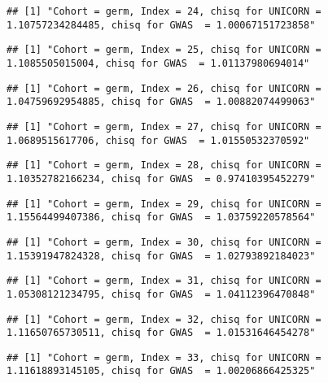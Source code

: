 \documentclass[]{article}
\begin{document}
\begin{verbatim}
## [1] "Cohort = germ, Index = 24, chisq for UNICORN = 1.10757234284485, chisq for GWAS  = 1.00067151723858"
\end{verbatim}

\begin{verbatim}
## [1] "Cohort = germ, Index = 25, chisq for UNICORN = 1.1085505015004, chisq for GWAS  = 1.01137980694014"
\end{verbatim}

\begin{verbatim}
## [1] "Cohort = germ, Index = 26, chisq for UNICORN = 1.04759692954885, chisq for GWAS  = 1.00882074499063"
\end{verbatim}

\begin{verbatim}
## [1] "Cohort = germ, Index = 27, chisq for UNICORN = 1.0689515617706, chisq for GWAS  = 1.01550532370592"
\end{verbatim}

\begin{verbatim}
## [1] "Cohort = germ, Index = 28, chisq for UNICORN = 1.10352782166234, chisq for GWAS  = 0.97410395452279"
\end{verbatim}

\begin{verbatim}
## [1] "Cohort = germ, Index = 29, chisq for UNICORN = 1.15564499407386, chisq for GWAS  = 1.03759220578564"
\end{verbatim}

\begin{verbatim}
## [1] "Cohort = germ, Index = 30, chisq for UNICORN = 1.15391947824328, chisq for GWAS  = 1.02793892184023"
\end{verbatim}

\begin{verbatim}
## [1] "Cohort = germ, Index = 31, chisq for UNICORN = 1.05308121234795, chisq for GWAS  = 1.04112396470848"
\end{verbatim}

\begin{verbatim}
## [1] "Cohort = germ, Index = 32, chisq for UNICORN = 1.11650765730511, chisq for GWAS  = 1.01531646454278"
\end{verbatim}

\begin{verbatim}
## [1] "Cohort = germ, Index = 33, chisq for UNICORN = 1.11618893145105, chisq for GWAS  = 1.00206866425325"
\end{verbatim}
\end{document}
